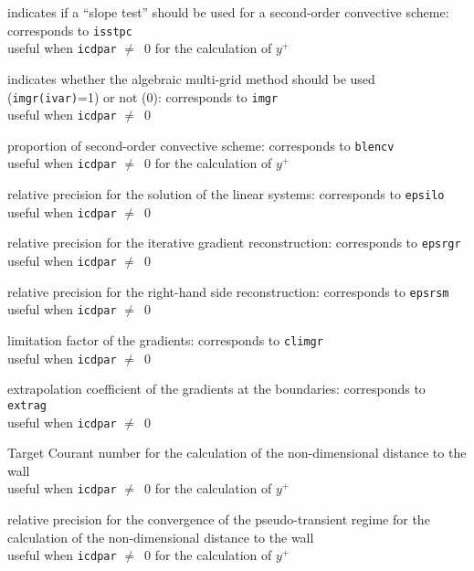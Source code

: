 {indicates if a ``slope test'' should be used for a second-order convective
scheme: corresponds to {\tt isstpc}\\
useful when {\tt icdpar} $\neq$\ 0 for the calculation of $y^+$}

{indicates whether the algebraic
multi-grid method should be used ({\tt imgr(ivar)}=1) or not (0): corresponds
to {\tt imgr}\\
useful when {\tt icdpar} $\neq$\ 0}

{proportion of second-order convective scheme: corresponds to {\tt blencv}\\
useful when {\tt icdpar} $\neq$\ 0 for the calculation of $y^+$}

{relative precision for the solution of the linear systems:
corresponds to {\tt epsilo}\\
useful when {\tt icdpar} $\neq$\ 0}

{relative precision for the iterative gradient reconstruction:
corresponds to {\tt epsrgr}\\
useful when {\tt icdpar} $\neq$\ 0}

{relative precision for the right-hand side reconstruction:
corresponds to {\tt epsrsm}\\
useful when {\tt icdpar} $\neq$\ 0}

{limitation factor of the gradients: corresponds to {\tt climgr}\\
useful when {\tt icdpar} $\neq$\ 0}

{extrapolation coefficient of the gradients at the boundaries:
corresponds to {\tt extrag}\\
useful when {\tt icdpar} $\neq$\ 0}

{Target Courant number for the calculation of the non-dimensional distance
to the wall\\
useful when {\tt icdpar} $\neq$\ 0 for the calculation of $y^+$}

{relative precision for the convergence of the pseudo-transient regime
for the calculation of the non-dimensional distance to the wall\\
useful when {\tt icdpar} $\neq$\ 0  for the calculation of $y^+$}

